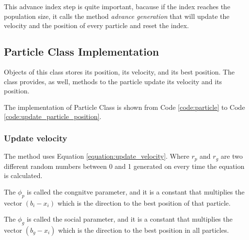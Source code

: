 This advance index step is quite important, bacause if the index reaches the population size, it calls the method \textit{advance generation} that will update the velocity and the position of every particle and reset the index.

\subsection {Particle Class Implementation}

Objects of this class stores its position, its velocity, and its best position. The class provides, as well, methods to the particle update its velocity and its position.

The implementation of Particle Class is shown from Code \ref{code:particle} to Code \ref{code:update_particle_position}.







\subsubsection{Update velocity}

The  method uses Equation \ref{equation:update_velocity}. Where $r_p$ and $r_g$ are two different random numbers between 0 and 1 generated on every time the equation is calculated.

The $\phi_p$ is called the congnitve parameter, and it is a constant that multiplies the vector $(b_i - x_i)$ which is the direction to the best position of that particle.

The $\phi_g$ is called the social parameter, and it is a constant that multiplies the vector $(b_g - x_i)$ which is the direction to the best position in all particles.

